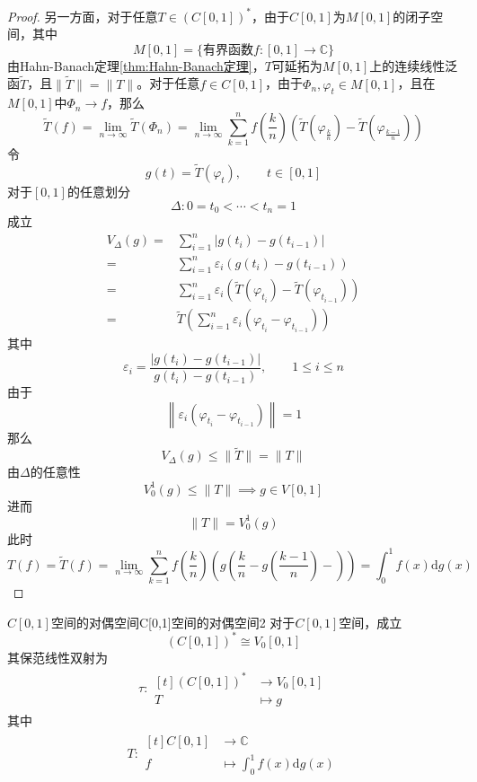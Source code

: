 \documentclass[lang = cn, scheme = chinese, thmcnt = section]{elegantbook}
\newcommand{\C}{\mathbb{C}}  		   %
\begin{document}
\begin{proof}
	另一方面，对于任意$T\in (C[0,1])^*$，由于$C[0,1]$为$M[0,1]$的闭子空间，其中
	$$
	M[0,1]=\{\text{有界函数}f:[0,1]\to \C\}
	$$
	由Hahn-Banach定理\ref{thm:Hahn-Banach定理}，$T$可延拓为$M[0,1]$上的连续线性泛函$\tilde{T}$，且$\|\tilde{T}\|=\|T\|$。对于任意$f\in C[0,1]$，由于$\Phi_n,\varphi_t\in M[0,1]$，且在$M[0,1]$中$\Phi_n\to f$，那么
	$$
	\tilde{T}(f)
	= \lim_{n\to\infty}\tilde{T}(\Phi_n)
	= \lim_{n\to\infty}\sum_{k=1}^{n}f\left(\frac{k}{n}\right)\left(\tilde{T}\left(\varphi_{\frac{k}{n}}\right)-\tilde{T}\left(\varphi_{\frac{k-1}{n}}\right)\right)
	$$
	令
	$$
	g(t)=\tilde{T}(\varphi_t),\qquad t\in [0,1]
	$$
	对于$[0,1]$的任意划分
	$$
	\Delta:0=t_0<\cdots<t_n=1
	$$
	成立
	\begin{align*}
		V_\Delta(g)
		= & \sum_{i=1}^{n}|g(t_i)-g(t_{i-1})|\\
		= & \sum_{i=1}^{n}\varepsilon_i(g(t_i)-g(t_{i-1}))\\
		= & \sum_{i=1}^{n}\varepsilon_i(\tilde{T}(\varphi_{t_i})-\tilde{T}(\varphi_{t_{i-1}}))\\
		= & \tilde{T}\left(\sum_{i=1}^{n}\varepsilon_i(\varphi_{t_i}-\varphi_{t_{i-1}})\right)
	\end{align*}
	其中
	$$
	\varepsilon_i=\frac{|g(t_i)-g(t_{i-1})|}{g(t_i)-g(t_{i-1})},\qquad 1\le i\le n
	$$
	由于
	$$
	\left\| \varepsilon_i(\varphi_{t_i}-\varphi_{t_{i-1}}) \right\|=1
	$$
	那么
	$$
	V_\Delta(g)\le \|\tilde{T}\| = \|T\|
	$$
	由$\Delta$的任意性
	$$
	V_0^1(g)\le \|T\|\implies g\in V[0,1]
	$$
	进而
	$$
	\|T\|=V_0^1(g)
	$$
	此时
	$$
	T(f)=\tilde{T}(f)
	= \lim_{n\to\infty}\sum_{k=1}^{n}f\left(\frac{k}{n}\right)\left(g\left(\frac{k}{n}-g\left(\frac{k-1}{n}\right)-\right)\right)
	= \int_0^1f(x)\mathrm{d}g(x)
	$$
\end{proof}

\begin{theorem}{$C[0,1]$空间的对偶空间}{C[0,1]空间的对偶空间2}
	对于$C[0,1]$空间，成立
	$$
	(C[0,1])^*\cong V_0[0,1]
	$$
	其保范线性双射为
	\begin{align*}
		\tau:\begin{aligned}[t]
			(C[0,1])^*&\longrightarrow V_0[0,1]\\
			T&\longmapsto g
		\end{aligned}
	\end{align*}
	其中
	\begin{align*}
		T:\begin{aligned}[t]
			C[0,1]&\longrightarrow \C\\
			f&\longmapsto \int_0^1 f(x)\mathrm{d}g(x)
		\end{aligned}
	\end{align*}
\end{theorem}
\end{document}
